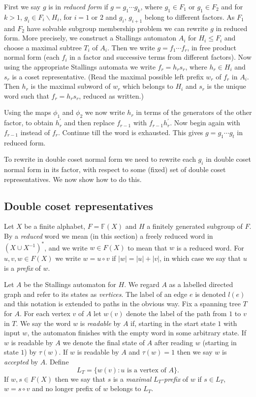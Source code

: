 \documentclass[a4paper,12pt]{article}
\renewcommand{\t}{\tau }
\numberwithin{equation}{section}
\numberwithin{figure}{section}
\newcommand{\FF}{\ensuremath{\mathbb{F}}}
\begin{document}
First we say $g$ is in \emph{reduced form} if $g = g_1 \cdots g_k$, where
$g_1 \in F_1$ or $g_1 \in F_2$ and 
for 
$k > 1$,    $g_i \in F_i \backslash H_i$, for $i=1$ or $2$ 
 and $g_i$, ${g_{i+1}}$ belong to different factors. As $F_1$ and 
$F_2$ have solvable subgroup membership problem we can rewrite $g$ in
reduced form. More precisely, we construct a Stallings automaton $A_i$ for
$H_i\le F_i$ and choose a maximal subtree $T_i$ of $A_i$. 
Then we write $g=f_1\cdots f_r$, in free product normal
form (each $f_i$ in a factor and successive terms from different factors).
Now using the appropriate Stallings automata we write $f_r=h_rs_r$, where
$h_r\in H_i$ and $s_r$ is a coset representative. (Read the maximal 
possible left prefix $w_r$ of $f_r$ in $A_i$. Then $h_r$ is the 
maximal subword of $w_r$ which belongs to $H_i$ and $s_r$ is the
unique word such that $f_r=h_rs_r$, reduced as written.)

Using the maps $\phi_1$ and $\phi_2$ we now write $h_r$ in terms of the
generators of the other factor, to obtain $h^\prime_r$ and then 
replace $f_{r-1}$ with $f_{r-1}h^\prime_r$. Now begin again with
$f_{r-1}$ instead of $f_r$. Continue till the word is exhausted.   
This gives $g=g_1\cdots g_t$ in reduced form.

To rewrite in double coset normal form we need to  
 rewrite
each $g_i$ in double coset normal form in its factor, 
with respect to some (fixed) set
of double coset representatives.  
We now show how to do this.
\subsection{Double coset representatives}
Let $X$ be a finite alphabet, $F=\FF(X)$ and $H$ a finitely generated subgroup
of $F$.  By a {\em reduced} word we mean (in
this section) a freely reduced word in $(X\cup X^{-1})^\ast$, and we write $w\in F(X)$
to mean that $w$ is a reduced word. For $u,v, w\in F(X)$ we 
write $w=u\circ v$ if $|w|=|u|+|v|$, in which case we say that $u$ is a {\em prefix}
of $w$. 

Let $A$ be the Stallings automaton for $H$. We regard $A$ as a 
labelled directed graph
and refer to its states as {\em vertices}. The label of an edge $e$ is denoted 
$l(e)$ and this notation is extended to paths in the obvious way. 
Fix a spanning tree $T$ for $A$. For 
each vertex $v$ of $A$ let $w(v)$ denote the label of the path from $1$ to $v$ in
$T$. We say the word $w$ is {\em readable} by $A$ if, starting in the 
start state $1$ with input $w$, the automaton finishes with the empty
word in some arbitrary state. If $w$ is readable by $A$ we denote the final
state of $A$ after reading $w$ (starting in state $1$) by $\t(w)$. 
If $w$ is readable by $A$ and $\t(w)=1$
 then we say $w$ is {\em accepted} by $A$. Define 
\[L_T=\{w(v): u \textrm{ is a vertex of } A\}.\]  
If $w, s\in F(X)$ then we say that $s$ is a {\em maximal} $L_T${\em -prefix} of $w$ if 
$s\in L_T$, $w=s\circ v$ and no longer prefix of $w$ belongs to $L_T$. 
\end{document}
